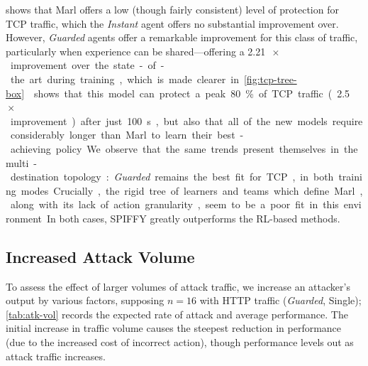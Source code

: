\documentclass[10pt, times, comsoc]{IEEEtran}
\begin{document}
 shows that Marl offers a low (though fairly consistent) level of protection for TCP traffic, which the \emph{Instant} agent offers no substantial improvement over.
However, \emph{Guarded} agents offer a remarkable improvement for this class of traffic, particularly when experience can be shared---offering a \SI{2.21}{$\!\times$} improvement over the state-of-the art during training, which is made clearer in \cref{fig:tcp-tree-box}.
 shows that this model can protect a peak \SI{80}{\percent} of TCP traffic (\SI{2.5}{$\!\times$} improvement) after just \SI{100}{\second}, but also that all of the new models require considerably longer than Marl to learn their best-achieving policy.
We observe that the same trends present themselves in the multi-destination topology: \emph{Guarded} remains the best fit for TCP, in both training modes.
Crucially, the rigid tree of learners and teams which define Marl, along with its lack of action granularity, seem to be a poor fit in this environment.
{\color{revisiontext}In both cases, SPIFFY greatly outperforms the RL-based methods.}


\subsection{Increased Attack Volume}\label{sec:results-attack-volume}
\cbstart
{\color{revisiontext}To assess the effect of larger volumes of attack traffic, we increase an attacker's output by various factors, supposing $n=16$ with HTTP traffic (\emph{Guarded}, Single); \cref{tab:atk-vol} records the expected rate of attack and average performance.
The initial increase in traffic volume causes the steepest reduction in performance (due to the increased cost of incorrect action), though performance levels out as attack traffic \cbend increases.}
\end{document}
